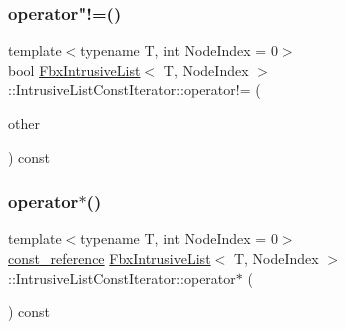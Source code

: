 \mbox{\label{class_fbx_intrusive_list_1_1_intrusive_list_const_iterator_ab924df909170812a2c12dcee743e7c87}} 
\subsubsection{\texorpdfstring{operator"!=()}{operator!=()}}
{\footnotesize\ttfamily template$<$typename T, int Node\+Index = 0$>$ \\
bool \hyperlink{class_fbx_intrusive_list}{Fbx\+Intrusive\+List}$<$ T, Node\+Index $>$\+::Intrusive\+List\+Const\+Iterator\+::operator!= (\begin{DoxyParamCaption}\item[{const \hyperlink{class_fbx_intrusive_list_1_1_intrusive_list_const_iterator}{Intrusive\+List\+Const\+Iterator} \&}]{other }\end{DoxyParamCaption}) const}

\mbox{\label{class_fbx_intrusive_list_1_1_intrusive_list_const_iterator_a32db6e7ef6d2f4404db030a0388fd4c9}} 
\subsubsection{\texorpdfstring{operator$\ast$()}{operator*()}}
{\footnotesize\ttfamily template$<$typename T, int Node\+Index = 0$>$ \\
\hyperlink{class_fbx_intrusive_list_a21904cb72c0ccae9d5c0b9f171befeb8}{const\+\_\+reference} \hyperlink{class_fbx_intrusive_list}{Fbx\+Intrusive\+List}$<$ T, Node\+Index $>$\+::Intrusive\+List\+Const\+Iterator\+::operator$\ast$ (\begin{DoxyParamCaption}{ }\end{DoxyParamCaption}) const}

